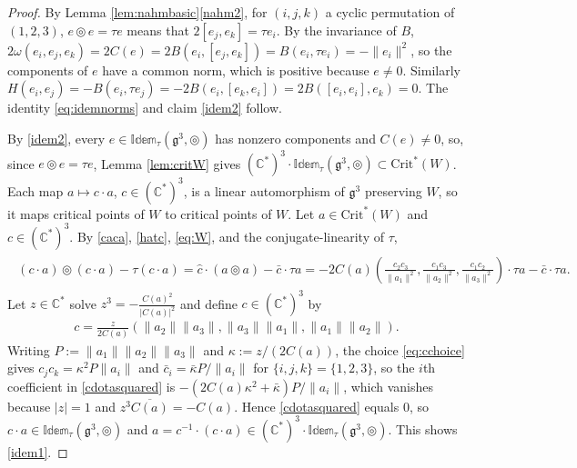 \documentclass [leqno, 10pt]{amsart}
\theoremstyle{definition}
\numberwithin{equation}{section}
\newcommand{\idem}{\mathbb{Idem}}
\newcommand{\tmlt}{\circledcirc}
\newcommand{\om}{\omega}
\newcommand{\g}{\mathfrak{g}}
\newcommand{\com}{\mathbb C}
\newcommand{\crtnt}{\mathrm{Crit}^*}
\newcommand{\norm}[1]{\lVert #1\rVert}
\begin{document}
\begin{proof}
By Lemma \ref{lem:nahmbasic}\ref{nahm2}, for $(i, j, k)$ a cyclic permutation of $(1, 2, 3)$, $e \tmlt e = \tau e$ means that $2[e_{j}, e_{k}] = \tau e_{i}$. By the invariance of $B$, $2\om(e_{i}, e_{j}, e_{k}) = 2C(e) = 2B(e_{i}, [e_{j}, e_{k}]) = B(e_{i}, \tau e_{i}) = -\norm{e_{i}}^{2}$, so the components of $e$ have a common norm, which is positive because $e \neq 0$. Similarly $H(e_{i}, e_{j}) = -B(e_{i}, \tau e_{j}) = -2B(e_{i}, [e_{k}, e_{i}]) = 2B([e_{i}, e_{i}], e_{k}) = 0$. The identity \eqref{eq:idemnorms} and claim \ref{idem2} follow.

By \ref{idem2}, every $e \in \idem_{\tau}(\g^{3}, \tmlt)$ has nonzero components and $C(e) \neq 0$, so, since $e \tmlt e = \tau e$, Lemma \ref{lem:critW} gives $(\com^{\ast})^{3}\cdot \idem_{\tau}(\g^{3}, \tmlt) \subset \crtnt(W)$. Each map $a \mapsto c\cdot a$, $c \in (\com^{\ast})^{3}$, is a linear automorphism of $\g^{3}$ preserving $W$, so it maps critical points of $W$ to critical points of $W$. Let $a \in \crtnt(W)$ and $c \in (\com^{\ast})^{3}$. By \eqref{caca}, \eqref{hatc}, \eqref{eq:W}, and the conjugate-linearity of $\tau$,
\begin{align}\label{cdotasquared}
\begin{aligned}
(c\cdot a)\tmlt (c\cdot a) - \tau(c \cdot a) = \hat{c}\cdot (a\tmlt a) - \bar{c}\cdot \tau a = -2C(a)\left(\tfrac{c_{2}c_{3}}{\norm{a_{1}}^{2}}, \tfrac{c_{1}c_{3}}{\norm{a_{2}}^{2}}, \tfrac{c_{1}c_{2}}{\norm{a_{3}}^{2}} \right)\cdot \tau a - \bar{c}\cdot \tau a.
\end{aligned}
\end{align}
Let $z \in \com^{\ast}$ solve $z^{3} = -\tfrac{C(a)^{2}}{|C(a)|^{2}}$ and define $c \in (\com^{\ast})^{3}$ by
\begin{align}\label{eq:cchoice}
c = \tfrac{z}{2C(a)}\left(\norm{a_{2}}\norm{a_{3}}, \norm{a_{3}}\norm{a_{1}}, \norm{a_{1}}\norm{a_{2}}\right).
\end{align}
Writing $P := \norm{a_{1}}\norm{a_{2}}\norm{a_{3}}$ and $\kappa := z/(2C(a))$, the choice \eqref{eq:cchoice} gives $c_{j}c_{k} = \kappa^{2}P\norm{a_{i}}$ and $\bar{c}_{i} = \bar{\kappa}P/\norm{a_{i}}$ for $\{i, j, k\} = \{1, 2, 3\}$, so the $i$th coefficient in \eqref{cdotasquared} is $-(2C(a)\kappa^{2} + \bar{\kappa})P/\norm{a_{i}}$, which vanishes because $|z| = 1$ and $z^{3}\overline{C(a)} = -C(a)$. Hence \eqref{cdotasquared} equals $0$, so $c \cdot a \in \idem_{\tau}(\g^{3}, \tmlt)$ and $a = c^{-1}\cdot(c \cdot a) \in (\com^{\ast})^{3}\cdot\idem_{\tau}(\g^{3}, \tmlt)$. This shows \ref{idem1}. 


\end{proof}
\end{document}
